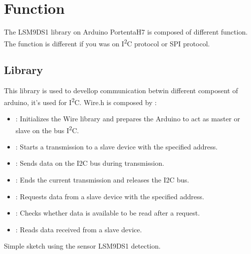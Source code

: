 	\bigskip



\section{Function}

The LSM9DS1 library on Arduino PortentaH7 is composed of different function. The function is different if you was on I\textsuperscript{2}C protocol or SPI protocol.
 

\bigskip



\subsection{Library }


This library is used to devellop communication betwin different composent of arduino, it's used for I\textsuperscript{2}C. Wire.h is composed by  \cite{arduino_wire:2024} : 
\begin{itemize}
	
	\item {}: Initializes the Wire library and prepares the Arduino to act as master or slave on the bus I\textsuperscript{2}C.
	\item {}: Starts a transmission to a slave device with the specified address.
	\item {} : Sends data on the I2C bus during transmission.
	\item {} : Ends the current transmission and releases the I2C bus.
	\item {} : Requests data from a slave device with the specified address.
	\item {}: Checks whether data is available to be read after a request.
	\item {}: Reads data received from a slave device.

\end{itemize}


\begin{code}
	
	
	 \caption{Simple sketch using the sensor LSM9DS1 detection.}\label{TestWire}
	 
\end{code}


